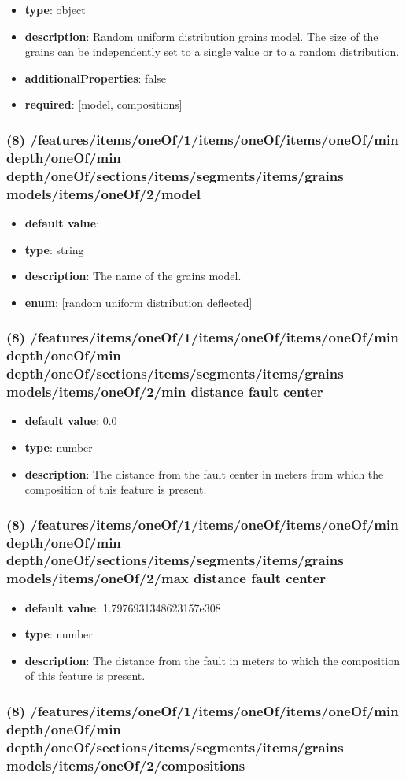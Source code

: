 \begin{itemize}[leftmargin=7em]\item {\bf type}: object
\item {\bf description}: Random uniform distribution grains model. The size of the grains can be independently set to a single value or to a random distribution.
\item {\bf additionalProperties}: false
\item {\bf required}: [model, compositions]\end{itemize}
\subsubsection{(8) /features/items/oneOf/1/items/oneOf/items/oneOf/min depth/oneOf/min depth/oneOf/sections/items/segments/items/grains models/items/oneOf/2/model}
\begin{itemize}[leftmargin=8em]\item {\bf default value}: 
\item {\bf type}: string
\item {\bf description}: The name of the grains model.
\item {\bf enum}: [random uniform distribution deflected]\end{itemize}\subsubsection{(8) /features/items/oneOf/1/items/oneOf/items/oneOf/min depth/oneOf/min depth/oneOf/sections/items/segments/items/grains models/items/oneOf/2/min distance fault center}
\begin{itemize}[leftmargin=8em]\item {\bf default value}: 0.0
\item {\bf type}: number
\item {\bf description}: The distance from the fault center in meters from which the composition of this feature is present.
\end{itemize}\subsubsection{(8) /features/items/oneOf/1/items/oneOf/items/oneOf/min depth/oneOf/min depth/oneOf/sections/items/segments/items/grains models/items/oneOf/2/max distance fault center}
\begin{itemize}[leftmargin=8em]\item {\bf default value}: 1.7976931348623157e308
\item {\bf type}: number
\item {\bf description}: The distance from the fault in meters to which the composition of this feature is present.
\end{itemize}\subsubsection{(8) /features/items/oneOf/1/items/oneOf/items/oneOf/min depth/oneOf/min depth/oneOf/sections/items/segments/items/grains models/items/oneOf/2/compositions}
